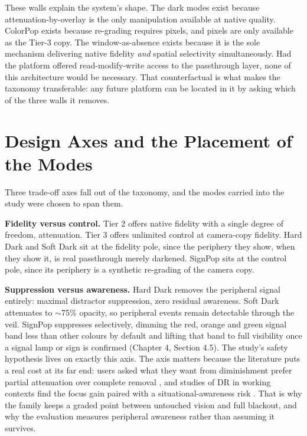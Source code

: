 These walls explain the system's shape. The dark modes exist because attenuation-by-overlay is the
only manipulation available at native quality. ColorPop exists because re-grading requires pixels,
and pixels are only available as the Tier-3 copy. The window-as-absence exists because it is the sole
mechanism delivering native fidelity \textit{and} spatial selectivity simultaneously. Had the
platform offered read-modify-write access to the passthrough layer, none of this architecture would
be necessary. That counterfactual is what makes the taxonomy transferable: any future platform can be
located in it by asking which of the three walls it removes.

\section{Design Axes and the Placement of the Modes}

Three trade-off axes fall out of the taxonomy, and the modes carried into the study were chosen to
span them.

\textbf{Fidelity versus control.} Tier 2 offers native fidelity with a single degree of freedom,
attenuation. Tier 3 offers unlimited control at camera-copy fidelity. Hard Dark and Soft Dark sit at
the fidelity pole, since the periphery they show, when they show it, is real passthrough merely
darkened. SignPop sits at the control pole, since its periphery is a synthetic re-grading of the
camera copy.

\textbf{Suppression versus awareness.} Hard Dark removes the peripheral signal entirely: maximal
distractor suppression, zero residual awareness. Soft Dark attenuates to $\sim$75\% opacity, so
peripheral events remain detectable through the veil. SignPop suppresses selectively, dimming the
red, orange and green signal band less than other colours by default and lifting that band to full
visibility once a signal lamp or sign is confirmed (Chapter 4, Section 4.5). The study's safety
hypothesis lives on exactly this axis. The axis matters because the literature puts a real cost at
its far end: users asked what they want from diminishment prefer partial attenuation over complete
removal \citep{cheng2022}, and studies of DR in working contexts find the focus gain paired with a
situational-awareness risk \citep{murph2021,mclaughlin2025}. That is why the family keeps a graded
point between untouched vision and full blackout, and why the evaluation measures peripheral
awareness rather than assuming it survives.

